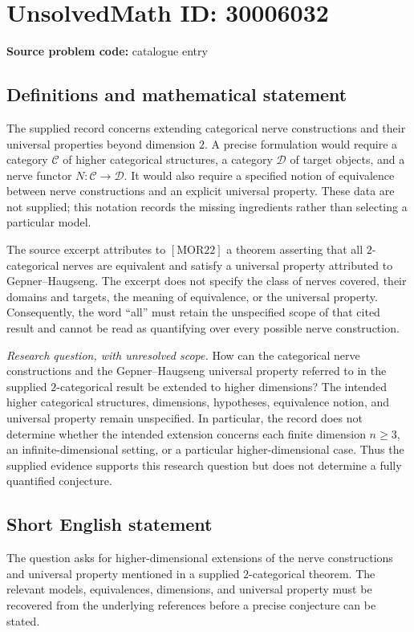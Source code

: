 \documentclass[11pt]{article}
\begin{document}
\section*{UnsolvedMath ID: 30006032}
\textbf{Source problem code:} catalogue entry
\subsection{Definitions and mathematical statement}
The supplied record concerns extending categorical nerve constructions and their universal properties beyond dimension \(2\). A precise formulation would require a category \(\mathcal C\) of higher categorical structures, a category \(\mathcal D\) of target objects, and a nerve functor \(N\colon\mathcal C\to\mathcal D\). It would also require a specified notion of equivalence between nerve constructions and an explicit universal property. These data are not supplied; this notation records the missing ingredients rather than selecting a particular model.

The source excerpt attributes to \([\mathrm{MOR22}]\) a theorem asserting that all \(2\)-categorical nerves are equivalent and satisfy a universal property attributed to Gepner--Haugseng. The excerpt does not specify the class of nerves covered, their domains and targets, the meaning of equivalence, or the universal property. Consequently, the word ``all'' must retain the unspecified scope of that cited result and cannot be read as quantifying over every possible nerve construction.

\emph{Research question, with unresolved scope.} How can the categorical nerve constructions and the Gepner--Haugseng universal property referred to in the supplied \(2\)-categorical result be extended to higher dimensions? The intended higher categorical structures, dimensions, hypotheses, equivalence notion, and universal property remain unspecified. In particular, the record does not determine whether the intended extension concerns each finite dimension \(n\geq 3\), an infinite-dimensional setting, or a particular higher-dimensional case. Thus the supplied evidence supports this research question but does not determine a fully quantified conjecture.
\subsection{Short English statement}
The question asks for higher-dimensional extensions of the nerve constructions and universal property mentioned in a supplied \(2\)-categorical theorem. The relevant models, equivalences, dimensions, and universal property must be recovered from the underlying references before a precise conjecture can be stated.
\end{document}
